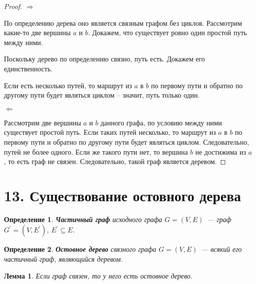 \documentclass[a4paper,12pt]{article}
\newtheorem*{defin}{Определение}
\newtheorem*{Lemma}{Лемма}
\begin{document}
    \begin{proof}
        \par $\Rightarrow$
        \par По определению дерева оно является связным графом без циклов.
        Рассмотрим какие-то две вершины $a$ и $b$. Докажем, что существует
        ровно один простой путь между ними.
        \par Поскольку дерево по определению связно, путь есть. Докажем его
        единственность.
        \par Если есть несколько путей, то маршрут из $a$ в $b$ по первому пути
        и обратно по другому пути будет являться циклом -- значит, путь только
        один.

        \par $\Leftarrow$
        \par Рассмотрим две вершины $a$ и $b$ данного графа, по условию между
        ними существует простой путь. Если таких путей несколько, то маршрут из
        $a$ в $b$ по первому пути и обратно по другому пути будет являться
        циклом. Следовательно, путей не более одного. Если же такого пути нет,
        то вершина $b$ не достижима из $a$, то есть граф не связен.
        Следовательно, такой граф является деревом.
    \end{proof}


 	\section*{13. Существование остовного дерева}
 	\begin{defin} \textbf{Частичный граф} исходного графа
 		$G = (V, E)$ — граф $G^{\prime} = (V, E^{\prime})$, $E^{\prime} \subseteq E$.
	\end{defin}

	\begin{defin} \textbf{Остовное дерево} связного графа $G = (V, E)$ — всякий его частичный граф, являющийся деревом.
	\end{defin}

	\begin{Lemma}
		Если граф связен, то у него есть остовное дерево.
	\end{Lemma}
\end{document}
